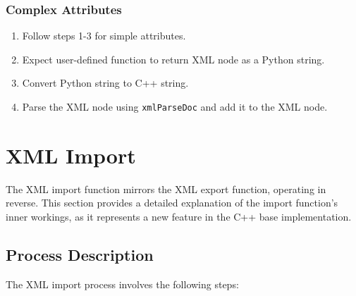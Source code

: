 \subsubsection{Complex Attributes}
\begin{enumerate}
\item Follow steps 1-3 for simple attributes.
\item Expect user-defined function to return XML node as a Python string.
\item Convert Python string to C++ string.
\item Parse the XML node using \verb|xmlParseDoc| \cite{libxml2-docu} and add it to the XML node.
\end{enumerate}


\section{XML Import}

The XML import function mirrors the XML export function, operating in reverse. This section provides a detailed explanation of the import function's inner workings, as it represents a new feature in the C++ base implementation.

\subsection{Process Description}

The XML import process involves the following steps:

